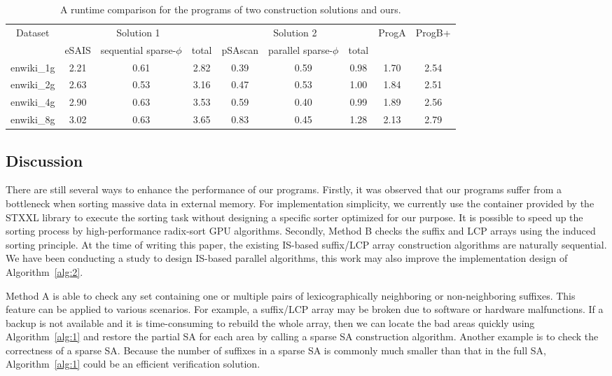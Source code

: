 \documentclass[10pt,journal,compsoc]{IEEEtran}
\begin{document}
\renewcommand\arraystretch{1.3}
\begin{table}[h]
	\caption{A runtime comparison for the programs of two construction solutions and ours.}
	\label{tbl:3}
	\centering
	\begin{tabular}{|c|c|c|c|c|c|c|c|c|}
		\hline
		\multirow{2}{*}{Dataset} & \multicolumn{3}{|c|}{Solution 1} & \multicolumn{3}{c|}{Solution 2} & \multirow{2}{*}{ProgA} & \multirow{2}{*}{ProgB+} \\\cline{2-7}
		 & eSAIS & sequential sparse-$\phi$ & total & pSAscan & parallel sparse-$\phi$ & total & & \\\hline
		enwiki\_1g & 2.21 & 0.61 & 2.82 & 0.39 & 0.59 & 0.98 & 1.70 & 2.54 \\\hline
		enwiki\_2g & 2.63 & 0.53 & 3.16 & 0.47 & 0.53 & 1.00 & 1.84 & 2.51 \\\hline
		enwiki\_4g & 2.90 & 0.63 & 3.53 & 0.59 & 0.40 & 0.99 & 1.89 & 2.56 \\\hline
		enwiki\_8g & 3.02 & 0.63 & 3.65 & 0.83 & 0.45 & 1.28 & 2.13 & 2.79 \\\hline
	\end{tabular}
\end{table}



\subsection{Discussion}

There are still several ways to enhance the performance of our programs. Firstly, it was observed that our programs suffer from a bottleneck when sorting massive data in external memory. For implementation simplicity, we currently use the container provided by the STXXL library to execute the sorting task without designing a specific sorter optimized for our purpose. It is possible to speed up the sorting process by high-performance radix-sort GPU algorithms. Secondly, Method B checks the suffix and LCP arrays using the induced sorting principle. At the time of writing this paper, the existing IS-based suffix/LCP array construction algorithms are naturally sequential. We have been conducting a study to design IS-based parallel algorithms, this work may also improve the implementation design of Algorithm~\ref{alg:2}. 

Method A is able to check any set containing one or multiple pairs of lexicographically neighboring or non-neighboring suffixes. This feature can be applied to various scenarios. For example, a suffix/LCP array may be broken due to software or hardware malfunctions. If a backup is not available and it is  time-consuming to rebuild the whole array, then we can locate the bad areas quickly using Algorithm~\ref{alg:1} and restore the partial SA for each area by calling a sparse SA construction algorithm. Another example is to check the correctness of a sparse SA. Because the number of suffixes in a sparse SA is commonly much smaller than that in the full SA, Algorithm~\ref{alg:1} could be an efficient verification solution.
\end{document}
